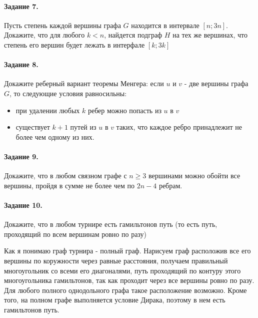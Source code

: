 \documentclass[a4paper,12pt]{article}
\begin{document}
\paragraph{Задание 7.} Пусть степень каждой вершины графа $G$ находится в интервале $\left[n;3n\right]$. Докажите, что для любого $k < n$, найдется подграф $H$ на тех же вершинах, что степень его вершин будет лежать в интерфале $\left[k;3k\right]$

\begin{Solution}
\end{Solution}

\paragraph{Задание 8.} Докажите реберный вариант теоремы Менгера: если $u$ и $v$ - две вершины графа $G$, то следующие условия равносильны:
\begin{itemize}
\item при удалении любых $k$ ребер можно попасть из $u$ в $v$

\item существует $k+1$ путей из $u$ в $v$ таких, что каждое ребро принадлежит не более чем одному из них.
\end{itemize}

\begin{Solution}
\end{Solution}

\paragraph{Задание 9.} Докажите, что в любом связном графе с $n \ge 3$ вершинами можно обойти все вершины, пройдя в сумме не более чем по $2n-4$ ребрам.

\begin{Solution}
\end{Solution}

\paragraph{Задание 10.} Докажите, что в любом турнире есть гамильтонов путь (то есть путь, проходящий по всем вершинам ровно по разу)

\begin{Solution}
Как я понимаю граф турнира - полный граф. Нарисуем граф расположив все его вершины по коружности через равные расстояния, получаем правильный многоугольник со всеми его диагоналями, путь проходящий по контуру этого многоугольника гамильтонов, так как проходит через все вершины ровно по разу. Для любого полного однодольного графа такое расположение возможно. Кроме того, на полном графе выполняется условие Дирака, поэтому в нем есть гамильтонов путь.
\end{Solution}
\end{document}

